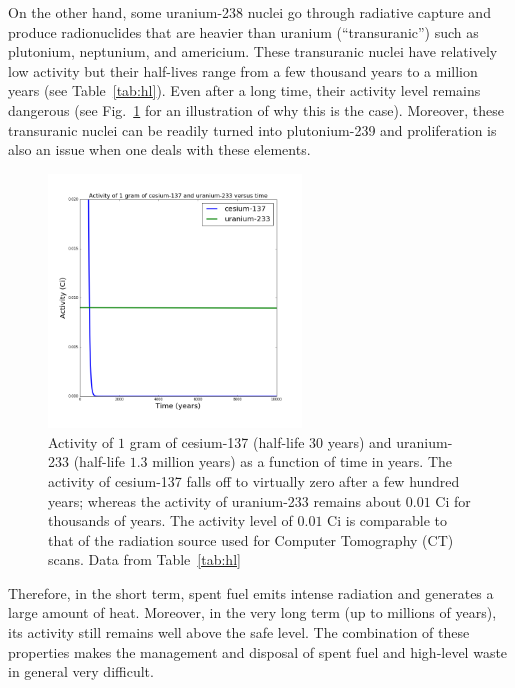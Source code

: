 \documentclass[nofootinbib,preprint,aps]{revtex4-1}
\begin{document}
        On the other hand, some uranium-238 nuclei go through radiative capture
        and produce radionuclides that are
        heavier than uranium (``transuranic'') such as plutonium, neptunium, and americium.
        These transuranic nuclei have relatively low activity but their half-lives range from a few thousand years
        to a million years (see Table~\ref{tab:hl}).
        Even after a long time, their activity level remains dangerous (see Fig.~\ref{fig:csru} for
        an illustration of why this is the case).
        Moreover, these transuranic nuclei can be readily turned into plutonium-239 and proliferation is also
        an issue when one deals with these elements.
        \begin{figure}[h]
            \centering
            \includegraphics[width=0.6\textwidth]{csur.png}
            \caption{Activity of $1$ gram of cesium-137 (half-life $30$ years) and uranium-233 (half-life $1.3$ million
            years) as a function of time in years. The activity of cesium-137 falls off to virtually zero after a few
        hundred years; whereas the activity of uranium-233 remains about $0.01$ Ci for thousands of years. The activity
    level of $0.01$ Ci is comparable to that of the radiation source used for Computer Tomography (CT) scans.
Data from Table~\ref{tab:hl}}
            \label{fig:csru}
        \end{figure}
        Therefore, in the short term, spent fuel emits intense radiation and generates a large amount of heat.
        Moreover, in the very long term (up to millions of years), its activity still remains well above the safe level.
        The combination of these properties makes the management and disposal of spent fuel and high-level waste
        in general very difficult.
\end{document}
